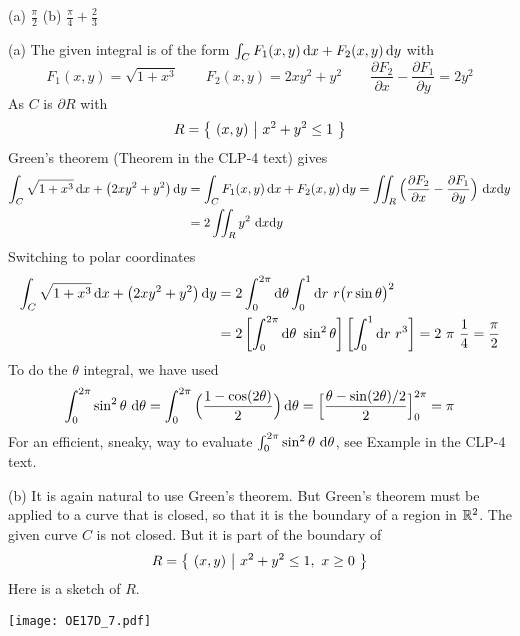 
\begin{answer} 
(a) $\frac{\pi}{2}$\qquad
(b) $\frac{\pi}{4}+\frac{2}{3}$
\end{answer}

\begin{solution} (a) The given integral is of the form 
  $\int_C F_1(x,y)\,\mathrm{d}x+F_2(x,y)\,\mathrm{d}y$ with
\begin{equation*}
F_1(x,y) = \sqrt{1+x^3}\qquad
F_2(x,y) = 2xy^2 + y^2\qquad
\frac{\partial F_2}{\partial x} - \frac{\partial F_1}{\partial y} = 2y^2
\end{equation*}
As $C$ is $\partial R$ with 
\begin{equation*}
R = \big\{ \ (x,y)\ \big|\  x^2+y^2\le 1\ \big\}
\end{equation*}
Green's theorem (Theorem  in the CLP-4 text)
gives
\begin{align*}
\int_C \sqrt{1+x^3}\,\mathrm{d}x +\big(2xy^2 + y^2\big)\,\mathrm{d}y
& = \int_C F_1(x,y)\,\mathrm{d}x+F_2(x,y)\,\mathrm{d}y
  = \iint_R \Big(\frac{\partial F_2}{\partial x} 
           - \frac{\partial F_1}{\partial y}\Big)\ \mathrm{d}x\mathrm{d}y \\
&= 2 \iint_R y^2\ \mathrm{d}x\mathrm{d}y
\end{align*}
Switching to polar coordinates
\begin{align*}
\int_C \sqrt{1+x^3}\,\dee{x} +\big(2xy^2 + y^2\big)\,\dee{y}
&= 2\int_0^{2\pi}\dee{\theta} \int_0^1\dee{r}\ 
         r\big(r\sin\theta\big)^2 \\
&= 2\left[\int_0^{2\pi}\dee{\theta}\ \sin^2\theta\right]
   \left[\int_0^1\dee{r}\ r^3\right]
=2\ \pi\ \frac{1}{4}
=\frac{\pi}{2}
\end{align*}
To do the $\theta$ integral, we have used
\begin{align*}
\int_0^{2\pi} \sin^2 \theta\ \mathrm{d}\theta
=\int_0^{2\pi} \Big(\frac{1-\cos(2\theta)}{2}\Big)\,\mathrm{d}\theta  
=\Big[\frac{\theta-\sin(2\theta)/2}{2} \Big]_0^{2\pi} 
= \pi
\end{align*}
For an efficient, sneaky, way to evaluate 
$\int_0^{2\pi} \sin^2 \theta\ \mathrm{d}\theta$, see Example
 in the CLP-4 text.

(b) It is again natural to use Green's theorem.
But Green's theorem must be applied to a curve that is closed,
so that it is the boundary of a region in $\mathbb{R}^2$. The given curve $C$
is not closed. But it is  part of the boundary of 
\begin{equation*}
R = \big\{ \ (x,y)\ \big|\ x^2+y^2\le 1,\ x\ge 0\ \big\}
\end{equation*}
Here is a sketch of $R$.
 \begin{center}
    \texttt{[image: OE17D\_7.pdf]}
\end{center}


\end{solution}
